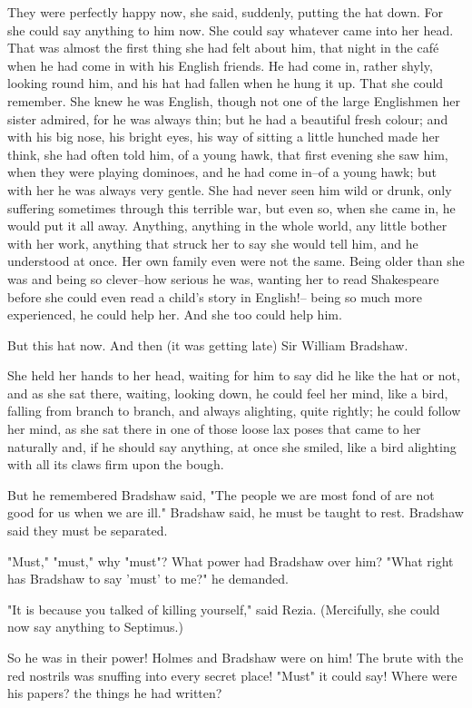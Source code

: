 \documentclass[lang=cn,10pt]{elegantbook}
\begin{document}
They were perfectly happy now, she said, suddenly, putting the hat
down.  For she could say anything to him now.  She could say
whatever came into her head.  That was almost the first thing she
had felt about him, that night in the café when he had come in with
his English friends.  He had come in, rather shyly, looking round
him, and his hat had fallen when he hung it up.  That she could
remember.  She knew he was English, though not one of the large
Englishmen her sister admired, for he was always thin; but he had a
beautiful fresh colour; and with his big nose, his bright eyes, his
way of sitting a little hunched made her think, she had often told
him, of a young hawk, that first evening she saw him, when they
were playing dominoes, and he had come in--of a young hawk; but
with her he was always very gentle.  She had never seen him wild or
drunk, only suffering sometimes through this terrible war, but even
so, when she came in, he would put it all away.  Anything, anything
in the whole world, any little bother with her work, anything that
struck her to say she would tell him, and he understood at once.
Her own family even were not the same.  Being older than she was
and being so clever--how serious he was, wanting her to read
Shakespeare before she could even read a child's story in English!--
being so much more experienced, he could help her.  And she too
could help him.

But this hat now.  And then (it was getting late) Sir William
Bradshaw.

She held her hands to her head, waiting for him to say did he like
the hat or not, and as she sat there, waiting, looking down, he
could feel her mind, like a bird, falling from branch to branch,
and always alighting, quite rightly; he could follow her mind, as
she sat there in one of those loose lax poses that came to her
naturally and, if he should say anything, at once she smiled, like
a bird alighting with all its claws firm upon the bough.

But he remembered Bradshaw said, "The people we are most fond of
are not good for us when we are ill."  Bradshaw said, he must be
taught to rest.  Bradshaw said they must be separated.

"Must," "must," why "must"?  What power had Bradshaw over him?
"What right has Bradshaw to say 'must' to me?" he demanded.

"It is because you talked of killing yourself," said Rezia.
(Mercifully, she could now say anything to Septimus.)

So he was in their power!  Holmes and Bradshaw were on him!  The
brute with the red nostrils was snuffing into every secret place!
"Must" it could say!  Where were his papers? the things he had
written?
\end{document}
